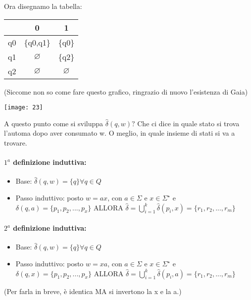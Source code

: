 \documentclass[12pt, a4paper, openany, oneside]{book}
\begin{document}
Ora disegnamo la tabella:
\begin{center}
\begin{tabular}{ |c|c|c| } 
\hline
& 0 & 1 \\ \hline
q0 & \{q0,q1\} & \{q0\} \\ 
\hline
q1 & $\varnothing$ & \{q2\} \\
\hline
q2 & $\varnothing$ & $\varnothing$ \\ 
\hline
\end{tabular}
(Siccome non so come fare questo grafico, ringrazio di nuovo l'esistenza di Gaia)

\texttt{[image: 23]}
\end{center}
A questo punto come si sviluppa $\widehat{\delta}(q,w)?$ Che ci dice in quale 
stato si trova l'automa dopo aver consumato w. O meglio, in quale insieme di stati
si va a trovare.
\paragraph{$1^{a}$ definizione induttiva: }
\begin{center}
\begin{itemize}
	\item Base: $\widehat{\delta}(q,w) = \{q\} \forall q \in Q$
	\item Passo induttivo: posto $w = ax$, con $a \in \Sigma$ e $x \in 
	\Sigma^{\star}$ e $\delta(q,a) = \{p_{1}, p_{2}, ..., p_{x}\}$ ALLORA
	$\widehat{\delta} = \bigcup \limits_{i=1}^{k} \widehat{\delta}(p_{i},x) =
	\{r_{1}, r_{2}, ..., r_{m}\}$
\end{itemize}
\end{center}

\paragraph{$2^{a}$ definizione induttiva: }
\begin{center}
\begin{itemize}
	\item Base: $\widehat{\delta}(q,w) = \{q\} \forall q \in Q$
	\item Passo induttivo: posto $w = xa$, con $a \in \Sigma$ e $x \in 
	\Sigma^{\star}$ e $\delta(q,x) = \{p_{1}, p_{2}, ..., p_{x}\}$ ALLORA
	$\widehat{\delta} = \bigcup \limits_{i=1}^{k} \widehat{\delta}(p_{i},a) =
	\{r_{1}, r_{2}, ..., r_{m}\}$
\end{itemize}
\end{center}
(Per farla in breve, è identica MA si invertono la x e la a.)
\end{document}
